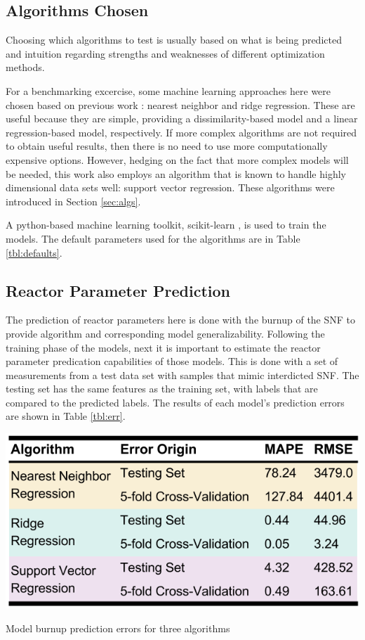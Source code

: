 \subsection{Algorithms Chosen}
\label{sec:choice}

Choosing which algorithms to test is usually based on what is being predicted
and intuition regarding strengths and weaknesses of different optimization
methods.  

For a benchmarking excercise, some machine learning approaches here were chosen
based on previous work \cite{dayman_feasibility_2013}: nearest neighbor and
ridge regression. These are useful because they are simple, providing a
dissimilarity-based model and a linear regression-based model, respectively. If
more complex algorithms are not required to obtain useful results, then there
is no need to use more computationally expensive options. However, hedging on
the fact that more complex models will be needed, this work also employs an
algorithm that is known to handle highly dimensional data sets well: support
vector regression. These algorithms were introduced in Section \ref{sec:algs}. 

A python-based machine learning toolkit, scikit-learn \cite{scikit}, is used to
train the models. The default parameters used for the algorithms are in
Table \ref{tbl:defaults}.

\subsection{Reactor Parameter Prediction}
\label{sec:rxtrparam}

The prediction of reactor parameters here is done with the burnup of the
\gls{SNF} to provide algorithm and corresponding model generalizability.
Following the training phase of the models, next it is important to estimate
the reactor parameter predication capabilities of those models. This is done
with a set of measurements from a test data set with samples that mimic
interdicted \gls{SNF}. The testing set has the same features as the training
set, with labels that are compared to the predicted labels. The results of each
model's prediction errors are shown in Table \ref{tbl:err}. 

\begin{table}[!htb]
  \centering
  \includegraphics[width=0.8\linewidth]{./chapters/demo_method/err.png}
  \caption{Model burnup prediction errors for three algorithms}
  \label{tbl:err}
\end{table}

